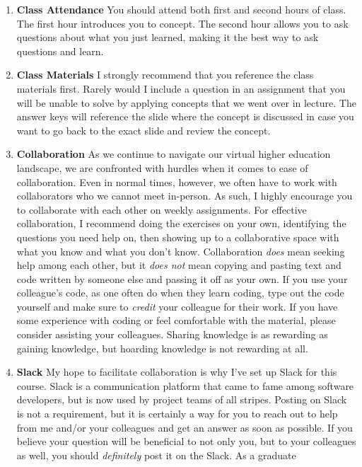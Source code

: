\documentclass[11pt,]{article}
\begin{document}
\begin{enumerate}
\def\labelenumi{\arabic{enumi}.}
\item
  \textbf{Class Attendance} You should attend both first and second
  hours of class. The first hour introduces you to concept. The second
  hour allows you to ask questions about what you just learned, making
  it the best way to ask questions and learn.
\item
  \textbf{Class Materials} I strongly recommend that you reference the
  class materials first. Rarely would I include a question in an
  assignment that you will be unable to solve by applying concepts that
  we went over in lecture. The answer keys will reference the slide
  where the concept is discussed in case you want to go back to the
  exact slide and review the concept.
\item
  \textbf{Collaboration} As we continue to navigate our virtual higher
  education landscape, we are confronted with hurdles when it comes to
  ease of collaboration. Even in normal times, however, we often have to
  work with collaborators who we cannot meet in-person. As such, I
  highly encourage you to collaborate with each other on weekly
  assignments. For effective collaboration, I recommend doing the
  exercises on your own, identifying the questions you need help on,
  then showing up to a collaborative space with what you know and what
  you don't know. Collaboration \emph{does} mean seeking help among each
  other, but it \emph{does not} mean copying and pasting text and code
  written by someone else and passing it off as your own. If you use
  your colleague's code, as one often do when they learn coding, type
  out the code yourself and make sure to \emph{credit} your colleague
  for their work. If you have some experience with coding or feel
  comfortable with the material, please consider assisting your
  colleagues. Sharing knowledge is as rewarding as gaining knowledge,
  but hoarding knowledge is not rewarding at all.
\item
  \textbf{Slack} My hope to facilitate collaboration is why I've set up
  Slack for this course. Slack is a communication platform that came to
  fame among software developers, but is now used by project teams of
  all stripes. Posting on Slack is not a requirement, but it is
  certainly a way for you to reach out to help from me and/or your
  colleagues and get an answer as soon as possible. If you believe your
  question will be beneficial to not only you, but to your colleagues as
  well, you should \emph{definitely} post it on the Slack. As a graduate

\end{enumerate}
\end{document}
